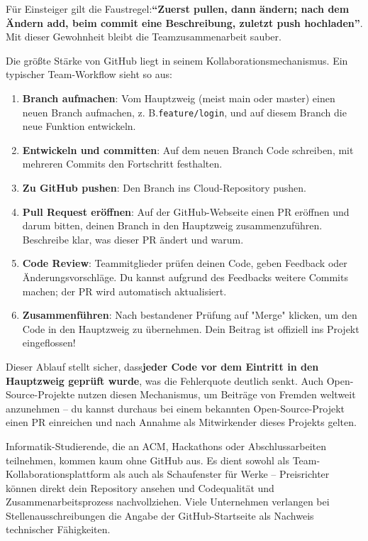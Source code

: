 Für Einsteiger gilt die Faustregel:\textbf{“Zuerst pullen, dann ändern; nach dem Ändern add, beim commit eine Beschreibung, zuletzt push hochladen”}. Mit dieser Gewohnheit bleibt die Teamzusammenarbeit sauber.


Die größte Stärke von GitHub liegt in seinem Kollaborationsmechanismus. Ein typischer Team-Workflow sieht so aus:

\begin{enumerate}
  \item \textbf{Branch aufmachen}: Vom Hauptzweig (meist main oder master) einen neuen Branch aufmachen, z. B.\texttt{feature/\allowbreak login}, und auf diesem Branch die neue Funktion entwickeln.
  \item \textbf{Entwickeln und committen}: Auf dem neuen Branch Code schreiben, mit mehreren Commits den Fortschritt festhalten.
  \item \textbf{Zu GitHub pushen}: Den Branch ins Cloud-Repository pushen.
  \item \textbf{Pull Request eröffnen}: Auf der GitHub-Webseite einen PR eröffnen und darum bitten, deinen Branch in den Hauptzweig zusammenzuführen. Beschreibe klar, was dieser PR ändert und warum.
  \item \textbf{Code Review}: Teammitglieder prüfen deinen Code, geben Feedback oder Änderungsvorschläge. Du kannst aufgrund des Feedbacks weitere Commits machen; der PR wird automatisch aktualisiert.
  \item \textbf{Zusammenführen}: Nach bestandener Prüfung auf "Merge" klicken, um den Code in den Hauptzweig zu übernehmen. Dein Beitrag ist offiziell ins Projekt eingeflossen!
\end{enumerate}

Dieser Ablauf stellt sicher, dass\textbf{jeder Code vor dem Eintritt in den Hauptzweig geprüft wurde}, was die Fehlerquote deutlich senkt. Auch Open-Source-Projekte nutzen diesen Mechanismus, um Beiträge von Fremden weltweit anzunehmen – du kannst durchaus bei einem bekannten Open-Source-Projekt einen PR einreichen und nach Annahme als Mitwirkender dieses Projekts gelten.



Informatik-Studierende, die an ACM, Hackathons oder Abschlussarbeiten teilnehmen, kommen kaum ohne GitHub aus. Es dient sowohl als Team-Kollaborationsplattform als auch als Schaufenster für Werke – Preisrichter können direkt dein Repository ansehen und Codequalität und Zusammenarbeitsprozess nachvollziehen. Viele Unternehmen verlangen bei Stellenausschreibungen die Angabe der GitHub-Startseite als Nachweis technischer Fähigkeiten.

